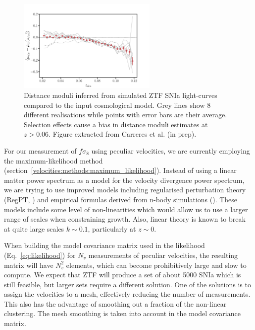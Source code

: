 \begin{figure}[t]
    \centering
    \includegraphics[width=0.6\textwidth]{fig/velocities/bastien_hd_residuals.pdf}
    \caption{Distance moduli inferred from simulated ZTF SNIa light-curves compared to the input cosmological model. 
    Grey lines show 8 different realisations while points with error bars are their average. 
    Selection effects cause a bias in distance moduli estimates at $z>0.06$. 
    Figure extracted from Carreres et al. (in prep).}
    \label{fig:ztf_snsim_hubble_diagram}
\end{figure}

For our measurement of $f\sigma_8$ using peculiar velocities, we are currently employing 
the maximum-likelihood method (section~\ref{velocities:methods:maximum_likelihood}). 
Instead of using a linear matter power spectrum as a model for the velocity divergence 
power spectrum, we are trying to use improved models including regularised perturbation 
theory (RegPT, \cite{taruyaDirectFastCalculation2012}) and empirical formulas derived
from n-body simulations (\cite{belAccurateFittingFunctions2019}). 
These models include some level of non-linearities which would allow us to use 
a larger range of scales when constraining growth. Also, linear theory is known to break 
at quite large scales $k\sim 0.1$, particularly at $z\sim0$. 

When building the model covariance matrix used in the likelihood (Eq.~\ref{eq:likelihood})
for $N_v$ measurements of peculiar velocities, the resulting matrix will have $N_v^2$ elements, 
which can become prohibitively large and slow to compute. We expect that ZTF will produce a set 
of about 5000 SNIa which is still feasible, but larger sets require a different solution. 
One of the solutions is to assign the velocities to a mesh, effectively reducing the number of 
measurements. This also has the advantage of smoothing out a fraction of the non-linear clustering. 
The mesh smoothing is taken into account in the model covariance matrix. 

